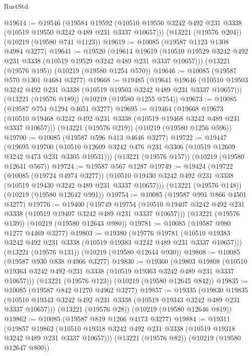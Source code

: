 \begin{lexlean}{RustStd}
\begin{coremodule}
@19614 := @19546
    (@19584
      @19592
      (@10510 @19550 @3242 @492 @231 @3338 (@10519 @19550 @3242 @489 @231 @3337 @10657)))
    (@13221 (@19576 @204))
    (@10219 (@19580 @741 @1123))
@19619 := @10085 (@19587 @1123 @1308 @4984 @3277)
@19641 := @19520
    (@19614
      @19619
      (@10510 @19529 @3242 @492 @231 @3338 (@10519 @19529 @3242 @489 @231 @3337 @10657)))
    (@13221 (@19576 @195))
    (@10219 (@19580 @1254 @570))
@19646 := @10085 (@19587 @570 @1301 @4684 @3277)
@19668 := @19485
    (@19641
      @19646
      (@10510 @19503 @3242 @492 @231 @3338 (@10519 @19503 @3242 @489 @231 @3337 @10657)))
    (@13221 (@19576 @189))
    (@10219 (@19580 @1255 @754))
@19673 := @10085 (@19587 @754 @1294 @4651 @3277)
@19695 := @19464
    (@19668
      @19673
      (@10510 @19468 @3242 @492 @231 @3338 (@10519 @19468 @3242 @489 @231 @3337 @10657)))
    (@13221 (@19576 @219))
    (@10219 (@19580 @1256 @596))
@19700 := @10085 (@19587 @596 @413 @4646 @3277)
@19722 := @19447
    (@19695
      @19700
      (@10510 @12609 @3242 @476 @231 @3306 (@10519 @12609 @3242 @473 @231 @3305 @10531)))
    (@13221 (@19576 @157))
    (@10219 (@19580 @12641 @567))
@19724 := @19587 @567 @1287
@19749 := @19424
    (@19722
      (@10085 (@19724 @4974 @3277))
      (@10510 @19430 @3242 @492 @231 @3338 (@10519 @19430 @3242 @489 @231 @3337 @10657)))
    (@13221 (@19576 @148))
    (@10219 (@19580 @12642 @991))
@19754 := @10085 (@19587 @991 @866 @4501 @3277)
@19776 := @19400
    (@19749
      @19754
      (@10510 @19407 @3242 @492 @231 @3338 (@10519 @19407 @3242 @489 @231 @3337 @10657)))
    (@13221 (@19576 @139))
    (@10219 (@19580 @12643 @980))
@19781 := @10085 (@19587 @980 @1277 @4469 @3277)
@19803 := @19380
    (@19776
      @19781
      (@10510 @19383 @3242 @492 @231 @3338 (@10519 @19383 @3242 @489 @231 @3337 @10657)))
    (@13221 (@19576 @131))
    (@10219 (@19580 @12644 @930))
@19808 := @10085 (@19587 @930 @838 @4966 @3277)
@19830 := @19360
    (@19803
      @19808
      (@10510 @19363 @3242 @492 @231 @3338 (@10519 @19363 @3242 @489 @231 @3337 @10657)))
    (@13221 (@19576 @123))
    (@10219 (@19580 @12645 @842))
@19835 := @10085 (@19587 @842 @1270 @4962 @3277)
@19857 := @19335
    (@19830
      @19835
      (@10510 @19343 @3242 @492 @231 @3338 (@10519 @19343 @3242 @489 @231 @3337 @10657)))
    (@13221 (@19576 @28))
    (@10219 (@19580 @12646 @819))
@19862 := @10085 (@19587 @819 @1266 @4173 @3277)
@19884 := @19311
    (@19857
      @19862
      (@10510 @19318 @3242 @492 @231 @3338 (@10519 @19318 @3242 @489 @231 @3337 @10657)))
    (@13221 (@19576 @82))
    (@10219 (@19580 @12647 @800))

\end{coremodule}
\end{lexlean}
